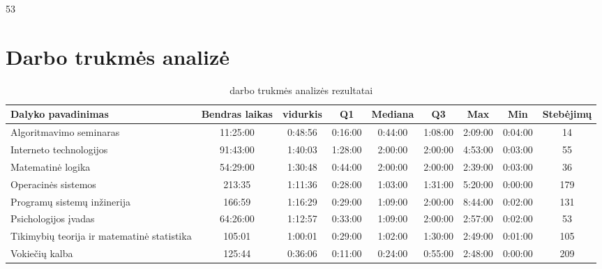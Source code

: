   53  \\
\chapter{Darbo trukmės analizė}

\begin{sidewaystable}
\centering
\begin{tabular}{|l|c|c|c|c|c|c|c|c|}
  \hline
  {\bf Dalyko pavadinimas} & {\bf Bendras laikas} & {\bf vidurkis } & {\bf Q1 } & {\bf Mediana} & {\bf Q3} & {\bf Max} & {\bf Min} & {\bf Stebėjimų}  \\
  \hline
  Algoritmavimo seminaras & 11:25:00 & 0:48:56 & 0:16:00 & 0:44:00 & 1:08:00 & 2:09:00 & 0:04:00 & 14 \\
  \hline
  Interneto technologijos & 91:43:00 & 1:40:03 & 1:28:00 & 2:00:00 & 2:00:00 & 4:53:00 & 0:03:00 & 55 \\
  \hline
  Matematinė logika & 54:29:00  & 1:30:48 & 0:44:00 & 2:00:00 & 2:00:00 & 2:39:00 & 0:03:00 & 36 \\
  \hline
  Operacinės sistemos & 213:35 & 1:11:36 & 0:28:00 & 1:03:00 & 1:31:00 & 5:20:00 & 0:00:00 & 179 \\
  \hline
  Programų sistemų inžinerija & 166:59 & 1:16:29 & 0:29:00 &1:09:00 & 2:00:00 & 8:44:00 & 0:02:00 & 131 \\
  \hline
  Psichologijos įvadas & 64:26:00 & 1:12:57 & 0:33:00 & 1:09:00 & 2:00:00 & 2:57:00 & 0:02:00 & 53 \\
  \hline
  Tikimybių teorija ir matematinė statistika & 105:01 & 1:00:01 & 0:29:00 & 1:02:00 & 1:30:00 & 2:49:00 & 0:01:00 & 105 \\
  \hline
  Vokiečių kalba & 125:44 & 0:36:06 & 0:11:00 & 0:24:00 & 0:55:00 & 2:48:00 & 0:00:00 & 209 \\
  \hline
\end{tabular}
\caption{darbo trukmės analizės rezultatai}
\end{sidewaystable}


